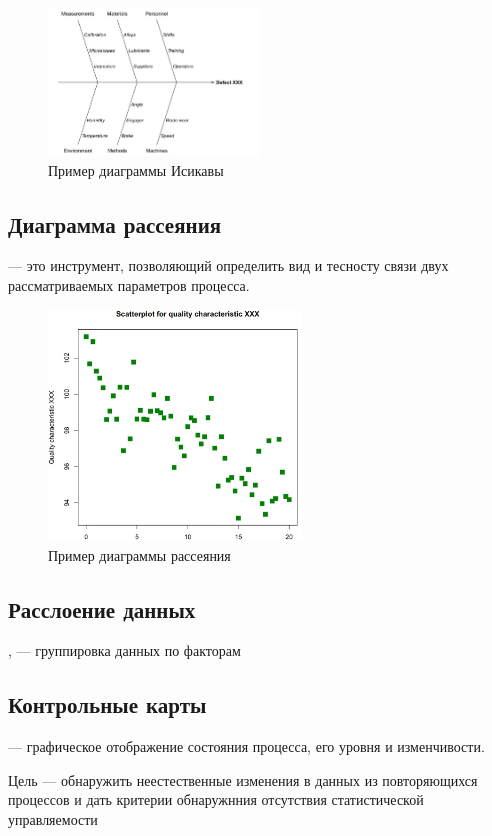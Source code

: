 \documentclass[a4paper, 14pt]{extarticle}
\begin{document}
\begin{figure}[h]
    \centering
    \includegraphics[width=0.5\textwidth]{./img/L4/S002.jpg}
    \caption{Пример диаграммы Исикавы}%
    \label{img:3:2}
\end{figure}

\subsection{Диаграмма рассеяния}
 --- это инструмент, позволяющий определить вид и тесносту связи двух рассматриваемых параметров процесса. 

\begin{figure}[h]
    \centering
    \includegraphics[width=0.6\textwidth]{./img/L4/S003.jpg}
    \caption{Пример диаграммы рассеяния}%
    \label{img:3:3}
\end{figure}

\subsection{Расслоение данных}
,  --- группировка данных по факторам

\subsection{Контрольные карты}
 --- графическое отображение состояния процесса, его уровня и изменчивости.

Цель --- обнаружить неестественные изменения в данных из повторяющихся процессов и дать критерии обнаружнния отсутствия статистической управляемости
\end{document}

